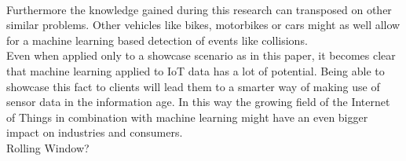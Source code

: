 \\
Furthermore the knowledge gained during this research can transposed on other similar problems. Other vehicles like bikes, motorbikes or cars might as well allow for a machine learning based detection of events like collisions. 
\\
Even when applied only to a showcase scenario as in this paper, it becomes clear that machine learning applied to IoT data has a lot of potential. Being able to showcase this fact to clients will lead them to a smarter way of making use of sensor data in the information age. In this way the growing field of the Internet of Things in combination with machine learning might have an even bigger impact on industries and consumers.
\\
Rolling Window?